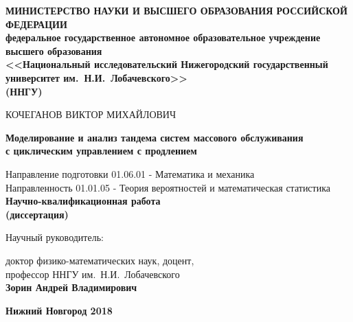 \documentclass[10pt]{extarticle}
\begin{document}
\begin{titlepage}

  \begin{center}
    \textbf{МИНИСТЕРСТВО НАУКИ И ВЫСШЕГО ОБРАЗОВАНИЯ РОССИЙСКОЙ ФЕДЕРАЦИИ\\
    федеральное государственное автономное образовательное учреждение
    высшего образования\\ {\large <<Национальный исследовательский Нижегородский государственный университет им.~Н.И.~Лобачевского>>  \\(ННГУ)}}
    
    \vfill 
    
    {\Large КОЧЕГАНОВ ВИКТОР МИХАЙЛОВИЧ
    \bigskip
    \bigskip
    \bigskip

     \textbf{Моделирование и анализ тандема систем массового обслуживания\\ с циклическим управлением с продлением}
    }
    
    \bigskip
    \bigskip
    {\large Направление подготовки 	01.06.01 - Математика и механика \\
    Направленность  01.01.05 - Теория вероятностей и математическая статистика\\
    }
 \vfill 
    \textbf{\Large Научно-квалификационная работа\\
    (диссертация)}
        \vfill 
  \hfill
    \begin{minipage}[h]{ 0.5\linewidth}\large

Научный руководитель:

\medskip
 доктор физико-математических наук, доцент,\\
\indent профессор ННГУ им.~Н.И.~Лобачевского\\
\indent \textbf{Зорин Андрей Владимирович}

    \end{minipage}
 \vfill 

    \textbf{\large Нижний Новгород 2018}
  \end{center}
  
\end{titlepage}
\end{document}
